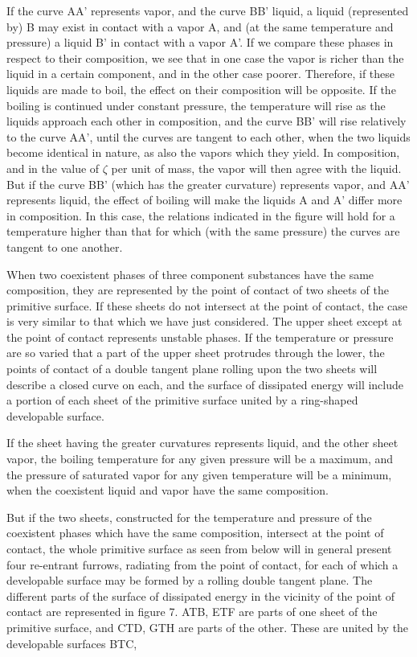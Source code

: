 \documentclass[11pt]{article}
\begin{document}
If the curve AA' represents vapor, and the curve BB' liquid, a liquid (represented by) B may exist in contact with a vapor A, and (at the same temperature and pressure) a liquid B' in contact with a vapor A'. If we compare these phases in respect to their composition, we see that in one case the vapor is richer than the liquid in a certain component, and in the other case poorer. Therefore, if these liquids are made to boil, the effect on their composition will be opposite. If the boiling is continued under constant pressure, the temperature will rise as the liquids approach each other in composition, and the curve BB' will rise relatively to the curve AA', until the curves are tangent to each other, when the two liquids become identical in nature, as also the vapors which they yield. In composition, and in the value of $\zeta$ per unit of mass, the vapor will then agree with the liquid. But if the curve BB' (which has the greater curvature) represents vapor, and AA' represents liquid, the effect of boiling will make the liquids A and A' differ more in composition. In this case, the relations indicated in the figure will hold for a temperature higher than that for which (with the same pressure) the curves are tangent to one another.

When two coexistent phases of three component substances have the same composition, they are represented by the point of contact of two sheets of the primitive surface. If these sheets do not intersect at the point of contact, the case is very similar to that which we have just considered. The upper sheet except at the point of contact represents unstable phases. If the temperature or pressure are so varied that a part of the upper sheet protrudes through the lower, the points of contact of a double tangent plane rolling upon the two sheets will describe a closed curve on each, and the surface of dissipated energy will include a portion of each sheet of the primitive surface united by a ring-shaped developable surface.

If the sheet having the greater curvatures represents liquid, and the other sheet vapor, the boiling temperature for any given pressure will be a maximum, and the pressure of saturated vapor for any given temperature will be a minimum, when the coexistent liquid and vapor have the same composition.

But if the two sheets, constructed for the temperature and pressure of the coexistent phases which have the same composition, intersect at the point of contact, the whole primitive surface as seen from below will in general present four re-entrant furrows, radiating from the point of contact, for each of which a developable surface may be formed by a rolling double tangent plane. The different parts of the surface of dissipated energy in the vicinity of the point of contact are represented in figure 7. ATB, ETF are parts of one sheet of the primitive surface, and CTD, GTH are parts of the other. These are united by the developable surfaces BTC,
\end{document}
